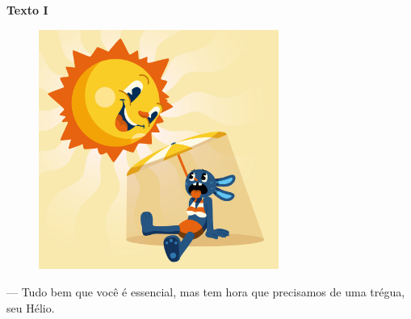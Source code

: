 \begin{myquote}
\begin{center}
\textbf{Texto I}
\end{center}

\begin{figure}[H]
\centering\includegraphics[width=0.7\textwidth]{./imgSAEB_6_POR/freepik/PORT_6_IMG-18.jpeg}
\end{figure}

--- Tudo bem que você é essencial, mas tem hora que precisamos de uma
trégua, seu Hélio.
\end{myquote}

